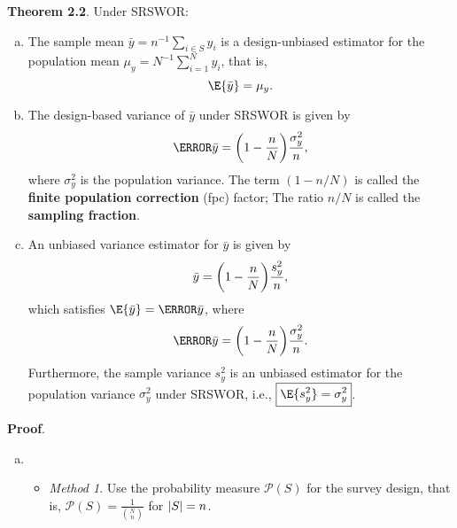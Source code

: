 \begin{Result}{}
    \textbf{Theorem 2.2}. Under SRSWOR\@:
    \begin{enumerate}[(a)]
        \item The sample mean $ \bar{y}=n^{-1}\sum_{i\in S}y_i $
              is a design-unbiased estimator for the population
              mean $ \mu_y=N^{-1}\sum_{i=1}^{N}y_i $, that is,
              \[ \E{\bar{y}}=\mu_y. \]
        \item The design-based variance of $ \bar{y} $
              under SRSWOR is given by
              \[ \V{\bar{y}}=\biggl(1-\frac{n}{N}\biggr)\frac{\sigma_y^2}{n}, \]
              where $ \sigma_y^2 $ is the population variance. The term
              $ (1-n/N) $ is called the \textbf{finite population correction} (fpc)
              factor; The ratio $ n/N $ is called the \textbf{sampling fraction}.
        \item An unbiased variance estimator for $ \bar{y} $ is given by
              \[ \relax{\bar{y}}=\biggl(1-\frac{n}{N}\biggr)\frac{s_y^2}{n}, \]
              which satisfies
              $ \E{\v{\bar{y}}}=\V{\bar{y}} $,
              where
              \[ \V{\bar{y}}=\biggl(1-\frac{n}{N}\biggr)\frac{\sigma_y^2}{n}. \]
              Furthermore, the sample variance $ s_y^2 $ is an unbiased estimator for the
              population variance $ \sigma_y^2 $ under SRSWOR, i.e.,
              $ \boxed{\E{s_y^2}=\sigma_y^2} $.
    \end{enumerate}
    \tcblower{}
    \textbf{Proof}.
    \begin{enumerate}[(a)]
        \item \begin{itemize}
                  \item \emph{Method 1}. Use the probability measure $ \mathcal{P}(S) $
                        for the survey design, that is, $ \mathcal{P}(S)=\frac{1}{\binom{N}{n}} $
                        for $ \lvert S\rvert=n $.


\end{itemize}
\end{enumerate}
\end{Result}
